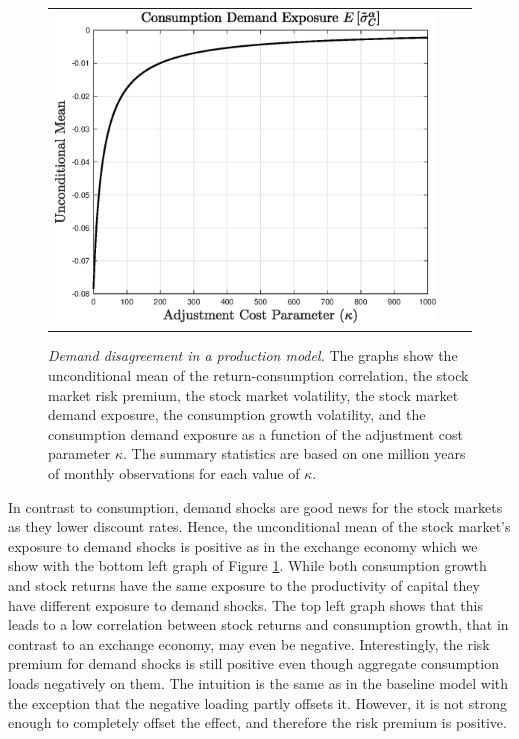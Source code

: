 \begin{figure}[htbp]
\begin{tabular}{ccc}
\includegraphics[width=.3\textwidth]{figures/FigProdsigalpC.eps} 
\end{tabular}
\caption{\emph{Demand disagreement in a production model.} \footnotesize{The graphs show the unconditional mean of the return-consumption correlation, the stock market risk premium, the stock market volatility, the stock market demand exposure, the consumption growth volatility, and the consumption demand exposure as a function of the adjustment cost parameter $\kappa$. The summary statistics are based on one million years of monthly observations for each value of $\kappa$.}} \label{fig:prod}
\end{figure}

In contrast to consumption, demand shocks are good news for the stock markets as they lower discount rates. Hence, the unconditional mean of the stock market's exposure to demand shocks is positive as in the exchange economy which we show with the bottom left graph of Figure \ref{fig:prod}. While both consumption growth and stock returns have the same exposure to the productivity of capital they have different exposure to demand shocks. The top left graph shows that this leads to a low correlation between stock returns and consumption growth, that in contrast to an exchange economy, may even be negative. Interestingly, the risk premium for demand shocks is still positive even though aggregate consumption loads negatively on them. The intuition is the same as in the baseline model with the exception that the negative loading partly offsets it. However, it is not strong enough to completely offset the effect, and therefore the risk premium is positive. 


	
	



